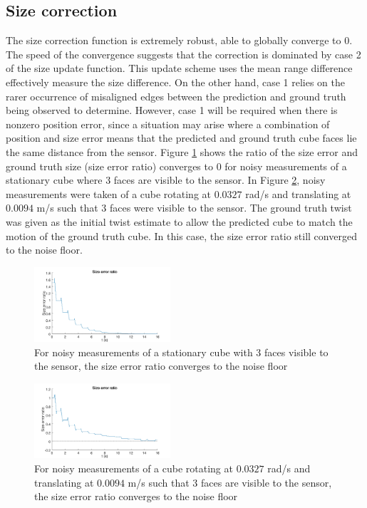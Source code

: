 \subsection{Size correction}
The size correction function is extremely robust, able to globally converge to 0. The speed of the convergence suggests that the correction is dominated by case 2 of the size update function. This update scheme uses the mean range difference effectively measure the size difference. On the other hand, case 1 relies on the rarer occurrence of misaligned edges between the prediction and ground truth being observed to determine.
However, case 1 will be required when there is nonzero position error, since a situation may arise where a combination of position and size error means that the predicted and ground truth cube faces lie the same distance from the sensor.
Figure \ref{fig:size_stationary} shows the ratio of the size error and ground truth size (size error ratio) converges to 0 for noisy measurements of a stationary cube where 3 faces are visible to the sensor. 
In Figure \ref{fig:size_RT_noise}, noisy measurements were taken of a cube rotating at $0.0327$ rad/s and translating at $0.0094$ m/s such that 3 faces were visible to the sensor. The ground truth twist was given as the initial twist estimate to allow the predicted cube to match the motion of the ground truth cube. In this case, the size error ratio still converged to the noise floor.

\begin{figure}[h]
	\centering
  	\includegraphics[width=0.45\textwidth,trim = 0mm 0mm 0mm 0mm,clip]{./Figures/size_error_ratio_1}\vspace*{0ex}
	\caption{For noisy measurements of a stationary cube with 3 faces visible to the sensor, the size error ratio converges to the noise floor}
  	\label{fig:size_stationary}
\end{figure}

\begin{figure}[h]
	\centering
  	\includegraphics[width=0.45\textwidth,trim = 0mm 0mm 0mm 0mm,clip]{./Figures/size_error_ratio_2_RT_noise}\vspace*{0ex}
	\caption{For noisy measurements of a cube rotating at $0.0327$ rad/s and translating at $0.0094$ m/s such that 3 faces are visible to the sensor, the size error ratio converges to the noise floor}
  	\label{fig:size_RT_noise}
\end{figure}

